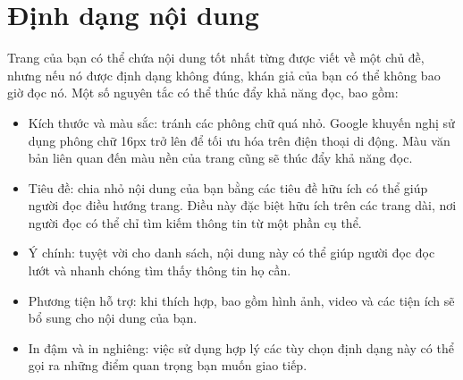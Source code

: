 \section{Định dạng nội dung}
Trang của bạn có thể chứa nội dung tốt nhất từng được viết về một chủ đề, nhưng nếu nó được định dạng không đúng, khán giả của bạn có thể không bao giờ đọc nó. Một số nguyên tắc có thể thúc đẩy khả năng đọc, bao gồm:
\begin{itemize}
	\item Kích thước và màu sắc: tránh các phông chữ quá nhỏ. Google khuyến nghị sử dụng phông chữ 16px trở lên để tối ưu hóa trên điện thoại di động. Màu văn bản liên quan đến màu nền của trang cũng sẽ thúc đẩy khả năng đọc.
	\item Tiêu đề: chia nhỏ nội dung của bạn bằng các tiêu đề hữu ích có thể giúp người đọc điều hướng trang. Điều này đặc biệt hữu ích trên các trang dài, nơi người đọc có thể chỉ tìm kiếm thông tin từ một phần cụ thể.
	\item Ý chính: tuyệt vời cho danh sách, nội dung này có thể giúp người đọc đọc lướt và nhanh chóng tìm thấy thông tin họ cần.
	\item Phương tiện hỗ trợ: khi thích hợp, bao gồm hình ảnh, video và các tiện ích sẽ bổ sung cho nội dung của bạn.
	\item In đậm và in nghiêng: việc sử dụng hợp lý các tùy chọn định dạng này có thể gọi ra những điểm quan trọng bạn muốn giao tiếp.
\end{itemize}
